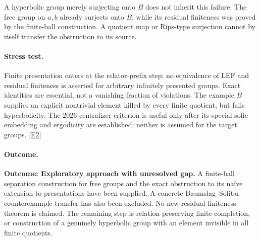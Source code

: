 \documentclass[11pt,a4paper]{article}
\newcommand{\eref}[2]{\hyperlink{extra:#1:#2}{[E#2]}}
\numberwithin{equation}{section}
\begin{document}
A hyperbolic group merely surjecting onto $B$ does not inherit this failure.
The free group on $a,b$ already surjects onto $B$, while its residual
finiteness was proved by the finite-ball construction. A quotient map or
Rips-type surjection cannot by itself transfer the obstruction to its source.

\paragraph{Stress test.}
Finite presentation enters at the relator-prefix step; no equivalence of
LEF and residual finiteness is asserted for arbitrary infinitely presented
groups. Exact identities are essential, not a vanishing fraction of
violations. The example $B$ supplies an explicit nontrivial element killed
by every finite quotient, but fails hyperbolicity. The 2026 centralizer
criterion is useful only after its special sofic embedding and ergodicity
are established; neither is assumed for the target groups. \eref{statement}{2}

\paragraph{Outcome.}
\textbf{Outcome: Exploratory approach with unresolved gap.}
A finite-ball separation construction for free groups and the exact obstruction
to its naïve extension to presentations have been supplied. A concrete
Baumslag--Solitar counterexample transfer has also been excluded. No new
residual-finiteness theorem is claimed. The remaining step is relation-preserving
finite completion, or construction of a genuinely hyperbolic group with an
element invisible in all finite quotients.

\end{document}
